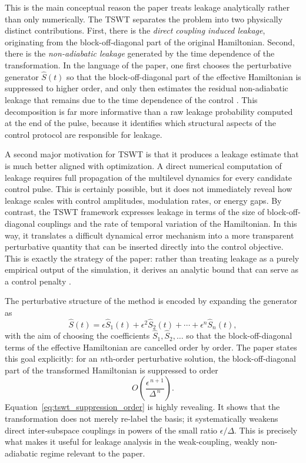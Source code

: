 This is the main conceptual reason the paper treats leakage analytically rather than only numerically. The TSWT separates the problem into two physically distinct contributions. First, there is the \emph{direct coupling induced leakage}, originating from the block-off-diagonal part of the original Hamiltonian. Second, there is the \emph{non-adiabatic leakage} generated by the time dependence of the transformation. In the language of the paper, one first chooses the perturbative generator $\hat{S}(t)$ so that the block-off-diagonal part of the effective Hamiltonian is suppressed to higher order, and only then estimates the residual non-adiabatic leakage that remains due to the time dependence of the control \cite{Niu2019}. This decomposition is far more informative than a raw leakage probability computed at the end of the pulse, because it identifies which structural aspects of the control protocol are responsible for leakage.

A second major motivation for TSWT is that it produces a leakage estimate that is much better aligned with optimization. A direct numerical computation of leakage requires full propagation of the multilevel dynamics for every candidate control pulse. This is certainly possible, but it does not immediately reveal how leakage scales with control amplitudes, modulation rates, or energy gaps. By contrast, the TSWT framework expresses leakage in terms of the size of block-off-diagonal couplings and the rate of temporal variation of the Hamiltonian. In this way, it translates a difficult dynamical error mechanism into a more transparent perturbative quantity that can be inserted directly into the control objective. This is exactly the strategy of the paper: rather than treating leakage as a purely empirical output of the simulation, it derives an analytic bound that can serve as a control penalty \cite{Niu2019}.

The perturbative structure of the method is encoded by expanding the generator as
\begin{equation}
\hat{S}(t)
=
\epsilon \hat{S}_1(t)
+
\epsilon^2 \hat{S}_2(t)
+
\cdots
+
\epsilon^n \hat{S}_n(t),
\label{eq:tswt_generator_expansion}
\end{equation}
with the aim of choosing the coefficients $\hat{S}_1,\hat{S}_2,\dots$ so that the block-off-diagonal terms of the effective Hamiltonian are cancelled order by order. The paper states this goal explicitly: for an $n$th-order perturbative solution, the block-off-diagonal part of the transformed Hamiltonian is suppressed to order
\begin{equation}
O\!\left(\frac{\epsilon^{\,n+1}}{\Delta^{\,n}}\right).
\label{eq:tswt_suppression_order}
\end{equation}
Equation~\eqref{eq:tswt_suppression_order} is highly revealing. It shows that the transformation does not merely re-label the basis; it systematically weakens direct inter-subspace couplings in powers of the small ratio $\epsilon/\Delta$. This is precisely what makes it useful for leakage analysis in the weak-coupling, weakly non-adiabatic regime relevant to the paper.

